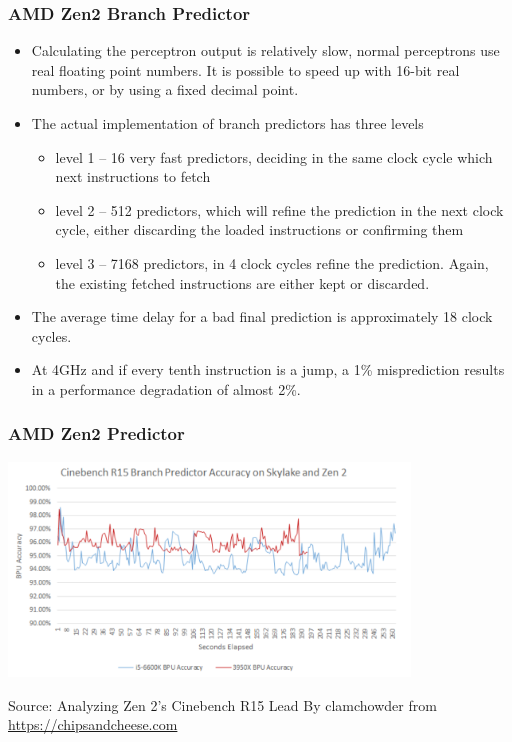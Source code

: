 \documentclass{beamer}
\begin{document}
\begin{frame}
\frametitle{AMD Zen2 Branch Predictor}

\begin{itemize}
\item Calculating the perceptron output is relatively slow, normal perceptrons use real floating point numbers. It is possible to speed up with 16-bit real numbers, or by using a fixed decimal point.
\item The actual implementation of branch predictors has three levels
\begin{itemize}
\item level 1 -- 16 very fast predictors, deciding in the same clock cycle which next instructions to fetch
\item level 2 -- 512 predictors, which will refine the prediction in the next clock cycle, either discarding the loaded instructions or confirming them
\item level 3 -- 7168 predictors, in 4 clock cycles refine the prediction. Again, the existing fetched instructions are either kept or discarded.
\end{itemize}
\item The average time delay for a bad final prediction is approximately 18 clock cycles.
\item At 4GHz and if every tenth instruction is a jump, a 1\% misprediction results in a performance degradation of almost 2\%.
\end{itemize}
\end{frame}


\begin{frame}
\frametitle{AMD Zen2 Predictor}

\begin{center}
\includegraphics[width=0.8\textwidth]{fig/amd_cinebench.png}
\end{center}

Source: Analyzing Zen 2's Cinebench R15 Lead
By clamchowder from \url{https://chipsandcheese.com}
\end{frame}
\end{document}
